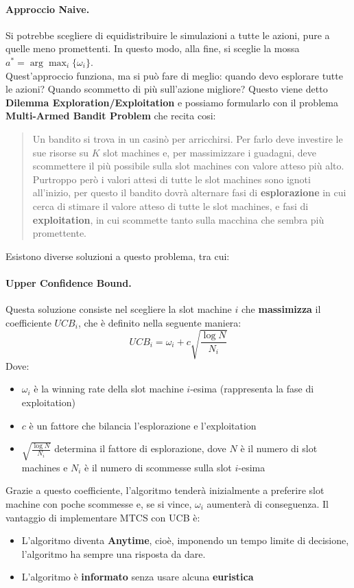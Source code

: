 \paragraph{Approccio Naive.}Si potrebbe scegliere di equidistribuire le simulazioni a tutte le azioni, pure a quelle
meno promettenti. In questo modo, alla fine, si sceglie la mossa $a^* = \arg \max_i \{\omega_i\}$.\\
Quest'approccio funziona, ma si può fare di meglio: quando devo esplorare tutte le azioni? Quando scommetto di più sull'azione
migliore? Questo viene detto \textbf{Dilemma Exploration/Exploitation} e possiamo formularlo con il problema \textbf{Multi-Armed Bandit Problem} che recita cosi:
\begin{quote}
    Un bandito si trova in un casinò per arricchirsi. Per farlo deve investire le sue risorse su $K$ slot machines e, per
    massimizzare i guadagni, deve scommettere il più possibile sulla slot machines con valore atteso più alto. Purtroppo però
    i valori attesi di tutte le slot machines sono ignoti all'inizio, per questo il bandito dovrà alternare fasi di \textbf{esplorazione}
    in cui cerca di stimare il valore atteso di tutte le slot machines, e fasi di \textbf{exploitation}, in cui scommette tanto sulla macchina
    che sembra più promettente. 
\end{quote}
Esistono diverse soluzioni a questo problema, tra cui:
\paragraph{Upper Confidence Bound.}Questa soluzione consiste nel scegliere la slot machine $i$ che \textbf{massimizza}
il coefficiente $UCB_i$, che è definito nella seguente maniera:
\begin{equation}
    UCB_i = \omega_i + c\sqrt{\frac{\log N}{N_i}}
\end{equation}
Dove:
\begin{itemize}
    \item $\omega_i$ è la winning rate della slot machine $i$-esima (rappresenta la fase di exploitation)
    \item $c$ è un fattore che bilancia l'esplorazione e l'exploitation
    \item $\sqrt{\frac{\log N}{N_i}}$ determina il fattore di esplorazione, dove $N$ è il numero di slot machines e $N_i$ è il numero di scommesse sulla slot $i$-esima
\end{itemize}
Grazie a questo coefficiente, l'algoritmo tenderà inizialmente a preferire slot machine con poche scommesse e, se si vince, $\omega_i$ aumenterà di conseguenza.
Il vantaggio di implementare MTCS con UCB è:
\begin{itemize}
    \item L'algoritmo diventa \textbf{Anytime}, cioè, imponendo un tempo limite di decisione, l'algoritmo ha sempre una risposta da dare.
    \item L'algoritmo è \textbf{informato} senza usare alcuna \textbf{euristica}
\end{itemize}

